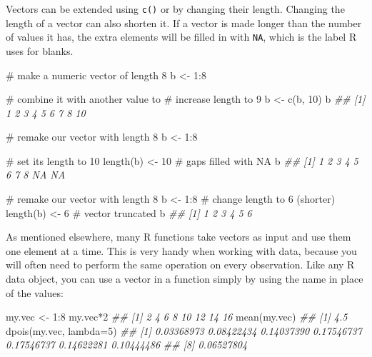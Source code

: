 \documentclass[
  13,
  letterpaper,
]{report}
\newenvironment{Shaded}{\begin{snugshade}}{\end{snugshade}}
\newcommand{\AttributeTok}[1]{\textcolor[rgb]{0.40,0.45,0.13}{#1}}
\newcommand{\CommentTok}[1]{\textcolor[rgb]{0.37,0.37,0.37}{#1}}
\newcommand{\DecValTok}[1]{\textcolor[rgb]{0.68,0.00,0.00}{#1}}
\newcommand{\DocumentationTok}[1]{\textcolor[rgb]{0.37,0.37,0.37}{\textit{#1}}}
\newcommand{\FunctionTok}[1]{\textcolor[rgb]{0.28,0.35,0.67}{#1}}
\newcommand{\NormalTok}[1]{\textcolor[rgb]{0.00,0.23,0.31}{#1}}
\newcommand{\OtherTok}[1]{\textcolor[rgb]{0.00,0.23,0.31}{#1}}
\newcommand{\SpecialCharTok}[1]{\textcolor[rgb]{0.37,0.37,0.37}{#1}}
\begin{document}
Vectors can be extended using \texttt{c()} or by changing their length.
Changing the length of a vector can also shorten it. If a vector is made
longer than the number of values it has, the extra elements will be
filled in with \texttt{NA}, which is the label R uses for blanks.

\begin{Shaded}
\begin{Highlighting}[]
\CommentTok{\# make a numeric vector of length 8}
\NormalTok{b }\OtherTok{\textless{}{-}} \DecValTok{1}\SpecialCharTok{:}\DecValTok{8}

\CommentTok{\# combine it with another value to }
\CommentTok{\# increase length to 9}
\NormalTok{b }\OtherTok{\textless{}{-}} \FunctionTok{c}\NormalTok{(b, }\DecValTok{10}\NormalTok{)}
\NormalTok{b}
\DocumentationTok{\#\# [1]  1  2  3  4  5  6  7  8 10}

\CommentTok{\# remake our vector with length 8}
\NormalTok{b }\OtherTok{\textless{}{-}} \DecValTok{1}\SpecialCharTok{:}\DecValTok{8}

\CommentTok{\# set its length to 10}
\FunctionTok{length}\NormalTok{(b) }\OtherTok{\textless{}{-}} \DecValTok{10}
\CommentTok{\# gaps filled with NA}
\NormalTok{b}
\DocumentationTok{\#\#  [1]  1  2  3  4  5  6  7  8 NA NA}

\CommentTok{\# remake our vector with length 8}
\NormalTok{b }\OtherTok{\textless{}{-}} \DecValTok{1}\SpecialCharTok{:}\DecValTok{8}
\CommentTok{\# change length to 6 (shorter)}
\FunctionTok{length}\NormalTok{(b) }\OtherTok{\textless{}{-}} \DecValTok{6}
\CommentTok{\# vector truncated}
\NormalTok{b}
\DocumentationTok{\#\# [1] 1 2 3 4 5 6}
\end{Highlighting}
\end{Shaded}

As mentioned elsewhere, many R functions take vectors as input and use
them one element at a time. This is very handy when working with data,
because you will often need to perform the same operation on every
observation. Like any R data object, you can use a vector in a function
simply by using the name in place of the values:

\begin{Shaded}
\begin{Highlighting}[]
\NormalTok{my.vec }\OtherTok{\textless{}{-}} \DecValTok{1}\SpecialCharTok{:}\DecValTok{8}
\NormalTok{my.vec}\SpecialCharTok{*}\DecValTok{2}
\DocumentationTok{\#\# [1]  2  4  6  8 10 12 14 16}
\FunctionTok{mean}\NormalTok{(my.vec)}
\DocumentationTok{\#\# [1] 4.5}
\FunctionTok{dpois}\NormalTok{(my.vec, }\AttributeTok{lambda=}\DecValTok{5}\NormalTok{)}
\DocumentationTok{\#\# [1] 0.03368973 0.08422434 0.14037390 0.17546737 0.17546737 0.14622281 0.10444486}
\DocumentationTok{\#\# [8] 0.06527804}
\end{Highlighting}
\end{Shaded}
\end{document}
